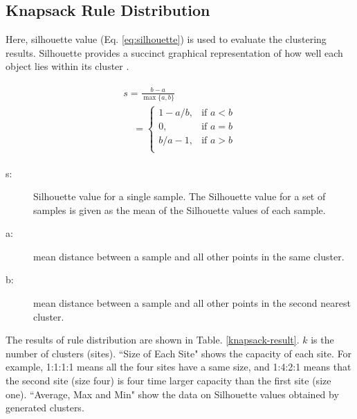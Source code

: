 \documentclass[fleqn,10pt,twocolumn]{SICE14}
\begin{document}
\subsection{Knapsack Rule Distribution}
Here, silhouette value (Eq. \ref{eq:silhouette}) is used to evaluate the clustering results. Silhouette provides a succinct graphical representation of how well each object lies within its cluster \cite{silhouette}.

\begin{eqnarray}
\begin{array}{lll}
s = \frac{b - a}{\max\{a,b\}} \\
\quad= \begin{cases} 1-a/b, & \mbox{if } a < b \\ 0, & \mbox{if } a = b \\ b/a-1, & \mbox{if } a > b \\ \end{cases} 
\end{array}
\label{eq:silhouette}
\end{eqnarray}
\begin{description}
\item [s:] Silhouette value for a single sample. The Silhouette value for a set of samples is given as the mean of the Silhouette values of each sample.
\item [a:] mean distance between a sample and all other points in the same cluster.
\item [b:] mean distance between a sample and all other points in the second nearest cluster.
\end{description}

The results of rule distribution are shown in Table. \ref{knapsack-result}.
$k$ is the number of clusters (sites).
``Size of Each Site" shows the capacity of each site. For example, 1:1:1:1 means all the four sites have a same size, and 1:4:2:1 means that the second site (size four) is four time larger capacity than the first site (size one).
``Average, Max and Min" show the data on Silhouette values obtained by generated clusters.
\end{document}
